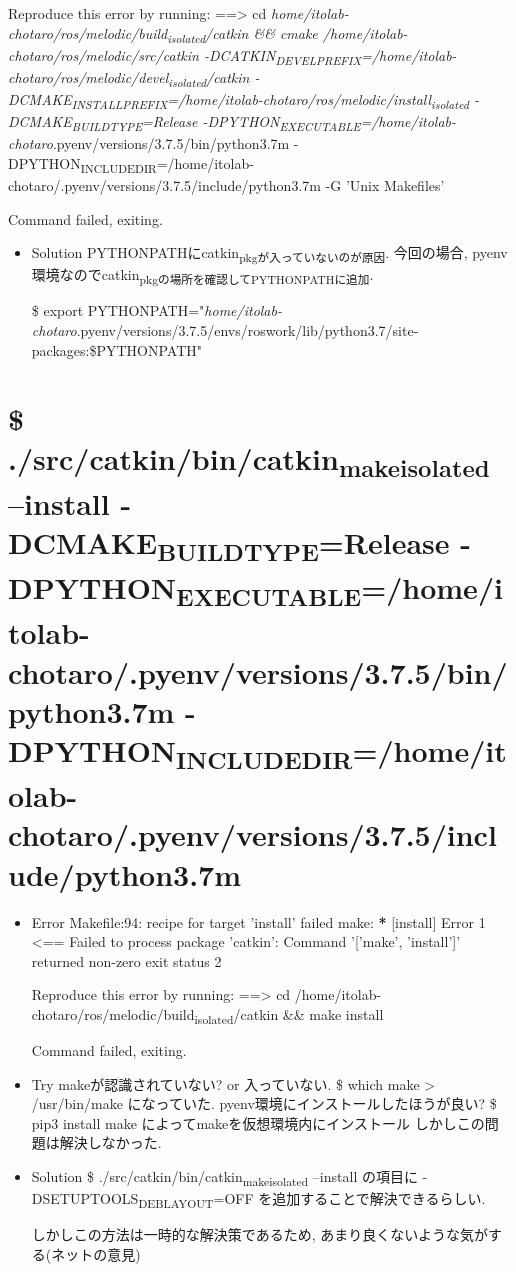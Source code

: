 \documentclass[11pt]{article}
\begin{document}
Reproduce this error by running:
==> cd \emph{home/itolab-chotaro/ros/melodic/build\textsubscript{isolated}/catkin \&\& cmake /home/itolab-chotaro/ros/melodic/src/catkin -DCATKIN\textsubscript{DEVEL}\textsubscript{PREFIX}=/home/itolab-chotaro/ros/melodic/devel\textsubscript{isolated}/catkin -DCMAKE\textsubscript{INSTALL}\textsubscript{PREFIX}=/home/itolab-chotaro/ros/melodic/install\textsubscript{isolated} -DCMAKE\textsubscript{BUILD}\textsubscript{TYPE}=Release -DPYTHON\textsubscript{EXECUTABLE}=/home/itolab-chotaro}.pyenv/versions/3.7.5/bin/python3.7m -DPYTHON\textsubscript{INCLUDE}\textsubscript{DIR}=/home/itolab-chotaro/.pyenv/versions/3.7.5/include/python3.7m -G 'Unix Makefiles'

Command failed, exiting.

\begin{itemize}
\item Solution
PYTHONPATHにcatkin\textsubscript{pkgが入っていないのが原因}.
今回の場合, pyenv環境なのでcatkin\textsubscript{pkgの場所を確認してPYTHONPATHに追加}.

\$ export PYTHONPATH="\emph{home/itolab-chotaro}.pyenv/versions/3.7.5/envs/roswork/lib/python3.7/site-packages:\$PYTHONPATH"
\end{itemize}

\section{\$ ./src/catkin/bin/catkin\textsubscript{make}\textsubscript{isolated} --install -DCMAKE\textsubscript{BUILD}\textsubscript{TYPE}=Release -DPYTHON\textsubscript{EXECUTABLE}=/home/itolab-chotaro/.pyenv/versions/3.7.5/bin/python3.7m -DPYTHON\textsubscript{INCLUDE}\textsubscript{DIR}=/home/itolab-chotaro/.pyenv/versions/3.7.5/include/python3.7m}
\label{sec:org9591c34}
\begin{itemize}
\item Error
Makefile:94: recipe for target 'install' failed
make: \textbf{*} [install] Error 1
<== Failed to process package 'catkin': 
  Command '['make', 'install']' returned non-zero exit status 2

Reproduce this error by running:
==> cd /home/itolab-chotaro/ros/melodic/build\textsubscript{isolated}/catkin \&\& make install

Command failed, exiting.

\item Try
makeが認識されていない? or 入っていない.
\$ which make
> /usr/bin/make
になっていた. pyenv環境にインストールしたほうが良い?
\$ pip3 install make
によってmakeを仮想環境内にインストール
しかしこの問題は解決しなかった.

\item Solution
\$ ./src/catkin/bin/catkin\textsubscript{make}\textsubscript{isolated} --install の項目に
-DSETUPTOOLS\textsubscript{DEB}\textsubscript{LAYOUT}=OFF を追加することで解決できるらしい.

しかしこの方法は一時的な解決策であるため, あまり良くないような気がする(ネットの意見)
\end{itemize}
\end{document}
